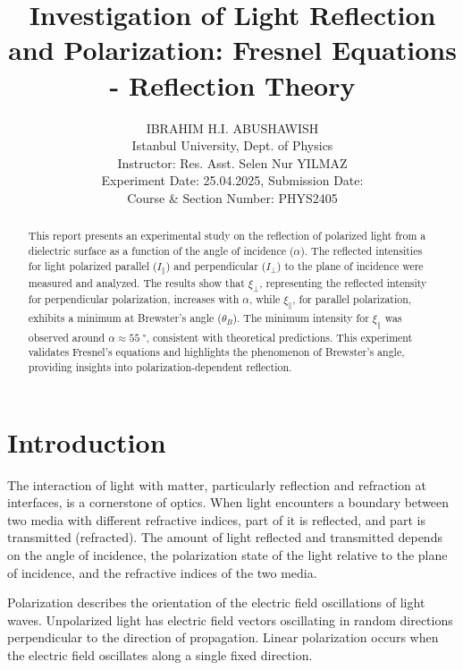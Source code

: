 \documentclass[journal]{IEEEtran}
\begin{document}
\title{Investigation of Light Reflection and Polarization: Fresnel Equations - Reflection Theory}
\author{{\large IBRAHIM H.I. ABUSHAWISH} \\ %
{\small Istanbul University, Dept. of Physics \\ 
Instructor: Res. Asst. Selen Nur YILMAZ \\ 
Experiment Date: 25.04.2025, Submission Date: \\ 
Course \& Section Number: PHYS2405}}


\maketitle
\begin{abstract}
    This report presents an experimental study on the reflection of polarized light from a dielectric surface as a function of the angle of incidence ($\alpha$). The reflected intensities for light polarized parallel ($I_{\parallel}$) and perpendicular ($I_{\perp}$) to the plane of incidence were measured and analyzed. The results show that $\xi_{\perp}$, representing the reflected intensity for perpendicular polarization, increases with $\alpha$, while $\xi_{\parallel}$, for parallel polarization, exhibits a minimum at Brewster's angle ($\theta_B$). The minimum intensity for $\xi_{\parallel}$ was observed around $\alpha \approx \SI{55}{\degree}$, consistent with theoretical predictions. This experiment validates Fresnel's equations and highlights the phenomenon of Brewster's angle, providing insights into polarization-dependent reflection.
\end{abstract}
\section{Introduction}
The interaction of light with matter, particularly reflection and refraction at interfaces, is a cornerstone of optics. When light encounters a boundary between two media with different refractive indices, part of it is reflected, and part is transmitted (refracted). The amount of light reflected and transmitted depends on the angle of incidence, the polarization state of the light relative to the plane of incidence, and the refractive indices of the two media.

Polarization describes the orientation of the electric field oscillations of light waves. Unpolarized light has electric field vectors oscillating in random directions perpendicular to the direction of propagation. Linear polarization occurs when the electric field oscillates along a single fixed direction.
\end{document}

